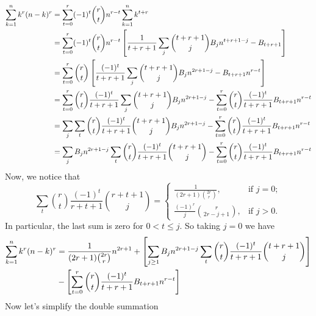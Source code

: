 \begin{equation*}
    \begin{split}
        \sum_{k=1}^{n} k^{r} (n-k)^{r}
        &= \sum_{t=0}^{r} (-1)^t \binom{r}{t} n^{r-t} \sum_{k=1}^{n} k^{t+r} \\
        &= \sum_{t=0}^{r} (-1)^t \binom{r}{t} n^{r-t} \left[ \frac{1}{t+r+1} \sum_{j} \binom{t+r+1}{j} {B}\sb{j} n^{t+r+1-j} - {B}\sb{t+r+1} \right] \\
        &= \sum_{t=0}^{r} \binom{r}{t} \left[ \frac{(-1)^t}{t+r+1} \sum_{j} \binom{t+r+1}{j} {B}\sb{j} n^{2r+1-j} - {B}\sb{t+r+1} n^{r-t} \right] \\
        &= \sum_{t=0}^{r} \binom{r}{t} \frac{(-1)^t}{t+r+1} \sum_{j} \binom{t+r+1}{j} {B}\sb{j} n^{2r+1-j} - \sum_{t=0}^{r} \binom{r}{t} \frac{(-1)^t}{t+r+1} {B}\sb{t+r+1} n^{r-t} \\
        &= \sum_{j} \sum_{t} \binom{r}{t} \frac{(-1)^t}{t+r+1} \binom{t+r+1}{j} {B}\sb{j} n^{2r+1-j} - \sum_{t=0}^{r} \binom{r}{t} \frac{(-1)^t}{t+r+1} {B}\sb{t+r+1} n^{r-t} \\
        &= \sum_{j} {B}\sb{j} n^{2r+1-j} \sum_{t} \binom{r}{t} \frac{(-1)^t}{t+r+1} \binom{t+r+1}{j} - \sum_{t=0}^{r} \binom{r}{t} \frac{(-1)^t}{t+r+1} {B}\sb{t+r+1} n^{r-t}
    \end{split}
\end{equation*}
Now, we notice that
\begin{equation}
    \sum_{t} \binom{r}{t} \frac{(-1)^t}{r+t+1} \binom{r+t+1}{j}
    =\begin{cases}
         \frac{1}{(2r+1) \binom{2r}r}, & \text{if } j=0;\\
         \frac{(-1)^r}{j} \binom{r}{2r-j+1}, & \text{if } j>0.
    \end{cases}\label{eq:combinatorial-identity}
\end{equation}
In particular, the last sum is zero for $0< t \leq j$.
So taking $j=0$ we have
\begin{equation*}
    \begin{split}
        \sum_{k=1}^{n} k^{r} (n-k)^{r}
        &= \frac{1}{(2r+1) \binom{2r}r} n^{2r+1} + \left[ \sum_{j \geq 1} {B}\sb{j} n^{2r+1-j} \sum_{t} \binom{r}{t} \frac{(-1)^t}{t+r+1} \binom{t+r+1}{j} \right] \\
        &- \left[ \sum_{t=0}^{r} \binom{r}{t} \frac{(-1)^t}{t+r+1} {B}\sb{t+r+1} n^{r-t} \right]
    \end{split}
\end{equation*}
Now let's simplify the double summation

